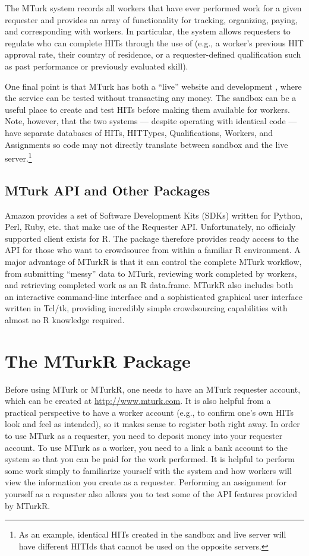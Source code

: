 The MTurk system records all workers that have ever performed work for a given requester and provides an array of functionality for tracking, organizing, paying, and corresponding with workers. In particular, the system allows requesters to regulate who can complete HITs through the use of  (e.g., a worker's previous HIT approval rate, their country of residence, or a requester-defined qualification such as past performance or previously evaluated skill).

One final point is that MTurk has both a ``live'' website and development , where the service can be tested without transacting any money. The sandbox can be a useful place to create and test HITs before making them available for workers. Note, however, that the two systems --- despite operating with identical code --- have separate databases of HITs, HITTypes, Qualifications, Workers, and Assignments so code may not directly translate between sandbox and the live server.\footnote{As an example, identical HITs created in the sandbox and live server will have different HITIds that cannot be used on the opposite servers.}

\subsection{MTurk API and Other Packages}
Amazon provides a set of Software Development Kits (SDKs) written for Python, Perl, Ruby, etc. that make use of the Requester API. Unfortunately, no officialy supported client exists for R. The  package therefore provides ready access to the API for those who want to crowdsource from within a familiar R environment. A major advantage of MTurkR is that it can control the complete MTurk workflow, from submitting ``messy'' data to MTurk, reviewing work completed by workers, and retrieving completed work as an R data.frame. MTurkR also includes both an interactive command-line interface and a sophisticated graphical user interface written in Tcl/tk, providing incredibly simple crowdsourcing capabilities with almost no R knowledge required.

\section{The MTurkR Package}
Before using MTurk or MTurkR, one needs to have an MTurk requester account, which can be created at \url{http://www.mturk.com}. It is also helpful from a practical perspective to have a worker account (e.g., to confirm one's own HITs look and feel as intended), so it makes sense to register both right away. In order to use MTurk as a requester, you need to deposit money into your requester account. To use MTurk as a worker, you need to a link a bank account to the system so that you can be paid for the work performed. It is helpful to perform some work simply to familiarize yourself with the system and how workers will view the information you create as a requester. Performing an assignment for yourself as a requester also allows you to test some of the API features provided by MTurkR.

